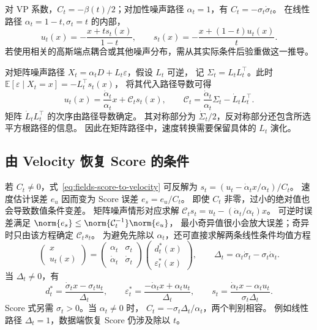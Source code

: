 对 VP 系数，\(C_t=-\beta(t)/2\)；对加性噪声路径
\(\alpha_t=1\)，有 \(C_t=-\sigma_t\dot\sigma_t\)。
在线性路径 \(\alpha_t=1-t,\sigma_t=t\) 的内部，
\[
 u_t(x)=-\frac{x+t s_t(x)}{1-t},\qquad
 s_t(x)=-\frac{x+(1-t)u_t(x)}t.
\]
若使用相关的高斯端点耦合或其他噪声分布，需从其实际条件后验重做这一推导。

对矩阵噪声路径 \(X_t=\alpha_tD+L_t\varepsilon\)，假设 \(L_t\) 可逆，
记 \(\Sigma_t=L_tL_t^\top\)。此时
\(\mathbb E[\varepsilon\mid X_t=x]=-L_t^\top s_t(x)\)，
将其代入路径导数可得
\[
 u_t(x)=\frac{\dot\alpha_t}{\alpha_t}x+\mathcal C_t s_t(x),\qquad
 \mathcal C_t=\frac{\dot\alpha_t}{\alpha_t}\Sigma_t-\dot L_tL_t^\top.
\]
矩阵 \(\dot L_tL_t^\top\) 的次序由路径导数确定。
其对称部分为 \(\dot\Sigma_t/2\)，反对称部分还包含所选平方根路径的信息。
因此在矩阵路径中，速度转换需要保留具体的 \(L_t\) 演化。

\subsection{由 Velocity 恢复 Score 的条件}

若 \(C_t\ne0\)，式~\eqref{eq:fields-score-to-velocity} 可反解为
\(s_t=(u_t-\dot\alpha_tx/\alpha_t)/C_t\)。
速度估计误差 \(e_u\) 因而变为 Score 误差 \(e_s=e_u/C_t\)。
即使 \(C_t\) 非零，过小的绝对值也会导致数值条件变差。
矩阵噪声情形对应求解 \(\mathcal C_ts_t=u_t-(\dot\alpha_t/\alpha_t)x\)。
可逆时误差满足 \(\norm{e_s}\le\norm{\mathcal C_t^{-1}}\norm{e_u}\)，
最小奇异值很小会放大误差；奇异时只由该方程确定 \(\mathcal C_ts_t\)。
为避免先除以 \(\alpha_t\)，还可直接求解两条线性条件均值方程
\begin{equation}
 \begin{pmatrix}x\\u_t(x)\end{pmatrix}
 =\begin{pmatrix}\alpha_t&\sigma_t\\\dot\alpha_t&\dot\sigma_t\end{pmatrix}
   \begin{pmatrix}d_t^*(x)\\\varepsilon_t^*(x)\end{pmatrix},\qquad
 \Delta_t=\alpha_t\dot\sigma_t-\sigma_t\dot\alpha_t.
 \label{eq:fields-path-determinant}
\end{equation}
当 \(\Delta_t\ne0\)，有
\begin{equation}
 d_t^*=\frac{\dot\sigma_t x-\sigma_tu_t}{\Delta_t},\qquad
 \varepsilon_t^*=\frac{-\dot\alpha_t x+\alpha_tu_t}{\Delta_t},\qquad
 s_t=\frac{\dot\alpha_t x-\alpha_tu_t}{\sigma_t\Delta_t}.
 \label{eq:fields-velocity-inverse}
\end{equation}
Score 式另需 \(\sigma_t>0\)。当 \(\alpha_t\ne0\) 时，
\(C_t=-\sigma_t\Delta_t/\alpha_t\)，两个判别相容。
例如线性路径 \(\Delta_t=1\)，数据端恢复 Score 仍涉及除以 \(t\)。

